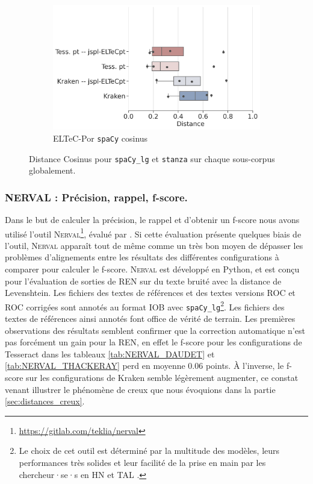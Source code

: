 \begin{figure}
      \begin{subfigure}{0.45\textwidth}
        \caption*{}
   \end{subfigure}
    \begin{subfigure}{0.5\textwidth}
  \includegraphics[height=.65\textwidth]{IMAGES/Boite-moustache/ELTeC-Por_spaCy3.5.1_cosinus.png} 
        \caption{ELTeC-Por \texttt{spaCy} cosinus}
   \end{subfigure}
    \caption{Distance Cosinus pour \texttt{spaCy\_lg} et \texttt{stanza} sur chaque sous-corpus globalement.}
    \label{fig:Cosinus-spacy-lg-stanza}
\end{figure}

\subsubsection{\textsc{NERVAL} : Précision, rappel, f-score.}

Dans le but de calculer la précision, le rappel et d'obtenir un f-score nous avons utilisé l'outil \textsc{Nerval}\footnote{\url{https://gitlab.com/teklia/nerval}}, évalué par \cite{koudoro2022reconnaissance}. Si cette évaluation présente quelques biais de l'outil, \textsc{Nerval} apparaît tout de même comme un très bon moyen de dépasser les problèmes d'alignements entre les résultats des différentes configurations à comparer pour calculer le f-score. \textsc{Nerval} est développé en Python, et est conçu pour l'évaluation de sorties de REN sur du texte bruité avec la distance de Levenshtein. Les fichiers des textes de références et des textes versions ROC et ROC corrigées sont annotés au format IOB avec \texttt{spaCy\_lg}\footnote{Le choix de cet outil est déterminé par la multitude des modèles, leurs performances très solides et leur facilité de la prise en main par les chercheur·se·s en HN et TAL \cite{DBLP:conf/gis/Koudoro-Parfait21}.}. Les fichiers des textes de références ainsi annotés font office de vérité de terrain.
Les premières observations des résultats semblent confirmer que la correction automatique n'est pas forcément un gain pour la REN, en effet le f-score pour les configurations de Tesseract dans les tableaux \ref{tab:NERVAL_DAUDET} et \ref{tab:NERVAL_THACKERAY} perd en moyenne 0.06 points. À l'inverse, le f-score sur les configurations de Kraken semble légèrement augmenter, ce constat venant illustrer le phénomène de creux que nous évoquions dans la partie \ref{sec:distances_creux}.

